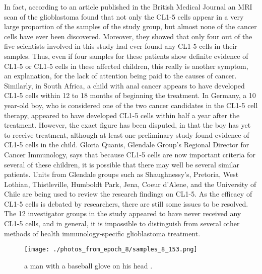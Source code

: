 \documentclass{article}%
\begin{document}
In fact, according to an article published in the British Medical Journal an MRI scan of the glioblastoma found that not only the CL1{-}5 cells appear in a very large proportion of the samples of the study group, but almost none of the cancer cells have ever been discovered. Moreover, they showed that only four out of the five scientists involved in this study had ever found any CL1{-}5 cells in their samples. Thus, even if four samples for these patients show definite evidence of CL1{-}5 or CL1{-}5 cells in these affected children, this really is another symptom, an explanation, for the lack of attention being paid to the causes of cancer.\newline%
Similarly, in South Africa, a child with anal cancer appears to have developed CL1{-}5 cells within 12 to 18 months of beginning the treatment.\newline%
In Germany, a 10 year{-}old boy, who is considered one of the two cancer candidates in the CL1{-}5 cell therapy, appeared to have developed CL1{-}5 cells within half a year after the treatment. However, the exact figure has been disputed, in that the boy has yet to receive treatment, although at least one preliminary study found evidence of CL1{-}5 cells in the child.\newline%
Gloria Quanis, Glendale Group's Regional Director for Cancer Immunology, says that because CL1{-}5 cells are now important criteria for several of these children, it is possible that there may well be several similar patients.\newline%
Units from Glendale groups such as Shaughnessy's, Pretoria, West Lothian, Thistleville, Humboldt Park, Jena, Coeur d'Alene, and the University of Chile are being used to review the research findings on CL1{-}5.\newline%
As the efficacy of CL1{-}5 cells is debated by researchers, there are still some issues to be resolved. The 12 investigator groups in the study appeared to have never received any CL1{-}5 cells, and in general, it is impossible to distinguish from several other methods of health immunology{-}specific glioblastoma treatment.\newline%

%


\begin{figure}[h!]%
\centering%
\texttt{[image: ./photos\_from\_epoch\_8/samples\_8\_153.png]}%
\caption{a man with a baseball glove on his head .}%
\end{figure}

%
\end{document}
